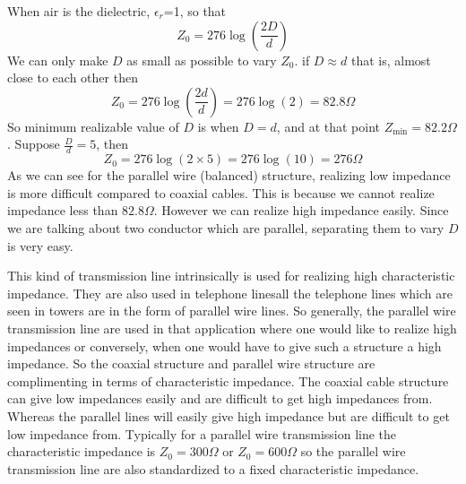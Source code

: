 When air is the dielectric, $\epsilon_r$=1, so that
\begin{equation}
Z_0 = 276\log(\dfrac{2D}{d})
\label{eqn:parallelwiretxair}
\end{equation}
We can only make $D$ as small as possible to vary $Z_0 $. if $D\approx d$ that is, almost close to each other then 
\begin{dmath*}
Z_0 = 276\log(\dfrac{2d}{d})
=276\log(2)
=82.8\varOmega
\end{dmath*}
So minimum realizable value of $D$ is when $D = d$, and at that point $Z_\min=82.2\varOmega$. Suppose $\frac{D}{d}=5$, then
\begin{dmath*}
Z_0 =276\log(2\times5)
=276\log(10)
=276\varOmega
\end{dmath*}
As we can see for the parallel wire (balanced) structure, realizing low impedance is more difficult compared to coaxial cables. This is because we cannot realize impedance less than $82.8\varOmega$. However we can realize high impedance easily. Since we are talking about two conductor which are parallel, separating them to vary $D$ is very easy.

This kind of transmission line intrinsically is used for realizing high characteristic impedance. They are also used in telephone lines\textemdash\;all the telephone lines which are seen in towers are in the form of parallel wire lines. So generally, the parallel wire transmission line are used in that application where one would like to realize high impedances or conversely, when one would have to give such a structure a high impedance. So the coaxial structure and parallel wire structure are complimenting in terms of characteristic impedance. The coaxial cable structure can give low impedances easily and are difficult to get high impedances from. Whereas the parallel lines will easily give high impedance but are difficult to get low impedance from. Typically for a parallel wire transmission line the characteristic impedance is $Z_0 =300\varOmega$ or $Z_0 =600\varOmega$ so the parallel wire transmission line are also standardized to a fixed characteristic impedance.

